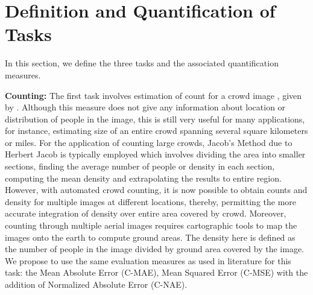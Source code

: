 \documentclass[runningheads]{llncs}
\begin{document}
\begin{comment}
Figure \ref{figCountStats} shows the absolute counts and average density per pixel for each image in the dataset.
\begin{figure*}[t]
\centering
\texttt{[image: figures/countStats.pdf]}
\caption{The figure shows two graphs overall the images in the dataset. The y-axis shows the absolute count (top) and average density per pixel (bottom) for all the images, where x-axes in both graphs shows the image number, sorted according to the two measures, respectively. The red color indicates training images, while blue color represents testing images.}
\label{figCountStats}
\end{figure*}
\end{comment}


\section{Definition and Quantification of Tasks}\label{secTasks}
In this section, we define the three tasks and the associated quantification measures.


\noindent\textbf{Counting:} The first task involves estimation of count for a crowd image , given by . Although this measure does not give any information about location or distribution of people in the image, this is still very useful for many applications, for instance, estimating size of an entire crowd spanning several square kilometers or miles. For the application of counting large crowds, Jacob's Method \cite{jacobmethod67} due to Herbert Jacob is typically employed which involves dividing the area  into smaller sections, finding the average number of people or density  in each section, computing the mean density  and extrapolating the results to entire region. However, with automated crowd counting, it is now possible to obtain counts and density for multiple images at different locations, thereby, permitting the more accurate integration of density over entire area covered by crowd. Moreover, counting through multiple aerial images requires cartographic tools to map the images onto the earth to compute ground areas. The density here is defined as the number of people in the image divided by ground area covered by the image. We propose to use the same evaluation measures as used in literature for this task: the Mean Absolute Error (C-MAE), Mean Squared Error (C-MSE) with the addition of Normalized Absolute Error (C-NAE).
\end{document}

